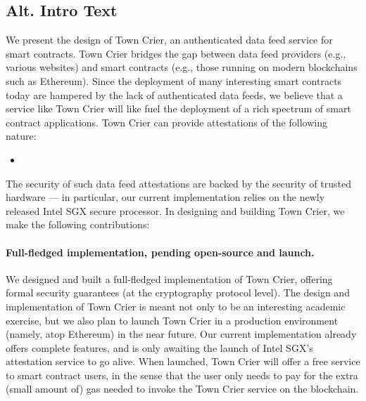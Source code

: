 \subsection{Alt. Intro Text}



We present the design of Town Crier, an authenticated data feed service for smart contracts. 
Town Crier bridges the gap between data 
feed providers (e.g., various websites)
and smart contracts (e.g., those running on modern blockchains
such as Ethereum). Since the deployment
of many interesting smart contracts 
today are hampered by the lack of authenticated data feeds,
we believe that a service like Town Crier will like
fuel the deployment of a rich spectrum  
of smart contract applications.
Town Crier can provide attestations of the following nature:

\begin{itemize}[leftmargin=3mm]
\item[]
\end{itemize}


The security of such data feed attestations
are backed by the security of trusted hardware --- in particular,
our current implementation relies on the newly released Intel SGX secure processor.
In designing and building Town Crier, we make the following contributions:

\paragraph{Full-fledged implementation, pending open-source and launch.}
We designed and built a full-fledged
implementation of Town Crier, offering formal security guarantees
(at the cryptography protocol level).
The design and implementation of Town Crier is meant not only to be  
an interesting academic exercise, but we also plan
to launch Town Crier 
in a production environment (namely, atop Ethereum)
in the near future. 
Our current implementation already offers complete features, and is
only awaiting  
the launch of Intel SGX's attestation service  
to go alive.
When launched, Town Crier will offer a free service to smart contract users, in the sense
that the user only needs to pay for the extra (small amount of) gas
needed to invoke the Town Crier
service on the blockchain. 

